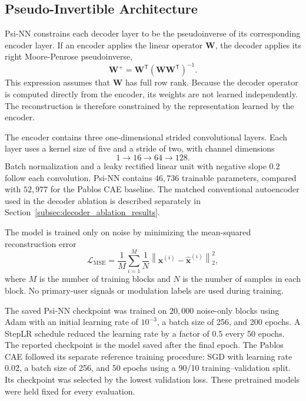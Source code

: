 \documentclass[conference]{IEEEtran}
\begin{document}
\subsection{Pseudo-Invertible Architecture}
\label{subsec:psinn_architecture}

Psi-NN constrains each decoder layer to be the pseudoinverse of its
corresponding encoder layer. If an encoder applies the linear operator
$\mathbf{W}$, the decoder applies its right Moore-Penrose pseudoinverse,
\begin{equation}
\mathbf{W}^{+}
=
\mathbf{W}^{\mathsf{T}}
\left(
\mathbf{W}\mathbf{W}^{\mathsf{T}}
\right)^{-1}.
\label{eq:right_pseudoinverse}
\end{equation}
This expression assumes that $\mathbf{W}$ has full row rank. Because
the decoder operator is computed directly from the encoder, its weights
are not learned independently. The reconstruction is therefore
constrained by the representation learned by the encoder.

The encoder contains three one-dimensional strided convolutional
layers. Each layer uses a kernel size of five and a stride of two, with
channel dimensions
\begin{equation}
1\rightarrow16\rightarrow64\rightarrow128.
\label{eq:psinn_channels}
\end{equation}
Batch normalization and a leaky rectified linear unit with negative
slope $0.2$ follow each convolution. Psi-NN contains $46{,}736$
trainable parameters, compared with $52{,}977$ for the Pablos CAE
baseline. The matched conventional autoencoder used in the decoder
ablation is described separately in
Section~\ref{subsec:decoder_ablation_results}.

The model is trained only on noise by minimizing the mean-squared
reconstruction error
\begin{equation}
\mathcal{L}_{\mathrm{MSE}}
=
\frac{1}{M}
\sum_{i=1}^{M}
\frac{1}{N}
\left\lVert
\mathbf{x}^{(i)}
-
\hat{\mathbf{x}}^{(i)}
\right\rVert_2^2,
\label{eq:training_mse}
\end{equation}
where $M$ is the number of training blocks and $N$ is the number of
samples in each block. No primary-user signals or modulation labels
are used during training.

The saved Psi-NN checkpoint was trained on $20{,}000$ noise-only
blocks using Adam with an initial learning rate of $10^{-3}$, a batch
size of 256, and 200 epochs. A StepLR schedule reduced the learning
rate by a factor of $0.5$ every 50 epochs. The reported checkpoint is
the model saved after the final epoch. The Pablos CAE followed its
separate reference training procedure: SGD with learning rate $0.02$,
a batch size of 256, and 50 epochs using a 90/10 training--validation
split. Its checkpoint was selected by the lowest validation loss.
These pretrained models were held fixed for every evaluation.
\end{document}
